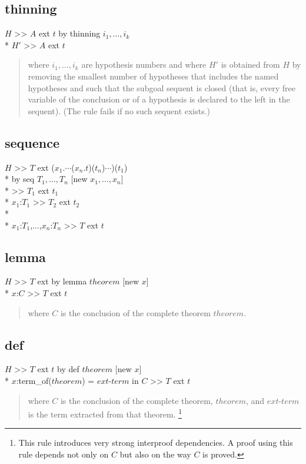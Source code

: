 \subsection*{thinning}
\goal $H$ >> $A$ ext $t$ by thinning $i_1, \ldots, i_k$\\*
\subgoal $H'$ >> $A$ ext $t$
\begin{quote}\rm
where $i_1, \ldots, i_k$  are hypothesis numbers and where $H'$
is obtained from $H$ by removing the smallest number of hypotheses that
includes the named hypotheses and such that the subgoal sequent is closed
(that is, every free variable of the conclusion or of a hypothesis is
declared to the left in the sequent).  (The rule fails if no such sequent
exists.)
\end{quote}

\subsection*{sequence}
\goal $H$ >> $T$ 
        ext (\bs$x_1$.$\cdots$(\bs$x_n$.$t$)($t_n$)$\cdots$)($t_1$)\\*
\continuegoal by seq $T_1,\dots,T_n$ [new $x_1,\dots,x_n$] \\*
\subgoal >> $T_1$ ext $t_1$\\*
\subgoal $x_1$:$T_1$ >> $T_2$ ext $t_2$ \\*
\subgoal \vellipsis \\*
\subgoal $x_1$:$T_1$,$\dots$,$x_n$:$T_n$ >> $T$ ext $t$

\subsection*{lemma}
\goal $H$ >> $T$
          ext 
          by lemma $theorem$ [new $x$] \\*
\subgoal $x$:$C$ >> $T$ ext $t$
\begin{quote}\rm
where $C$ is the conclusion of the complete theorem $theorem$.
\end{quote}

\subsection*{def}
\goal $H$ >> $T$ ext $t$ by def ${theorem}$ [new $x$] \\*
\subgoal $x$:term\_of(${theorem}$) = ${ext}$-${term}$ in $C$ >>
$T$ ext $t$
\begin{quote}\rm
where $C$ is the conclusion of the complete theorem, ${theorem}$,
and ${ext}$-${term}$ is the term extracted from that theorem.
\footnote{This rule introduces very strong interproof dependencies.
A proof using this rule depends not only on $C$ but also on the way
$C$ is proved.}
\end{quote}

